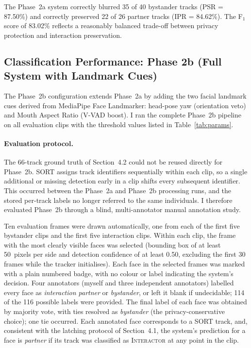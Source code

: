 The Phase~2a system correctly blurred 35 of 40 bystander tracks (PSR = 87.50\%) and
correctly preserved 22 of 26 partner tracks (IPR = 84.62\%). The F$_1$ score of
83.02\% reflects a reasonably balanced trade-off between privacy protection and
interaction preservation.

\subsection{Classification Performance: Phase 2b (Full System with Landmark Cues)}
\label{sec:results_2b}

The Phase~2b configuration extends Phase~2a by adding the two facial landmark
cues derived from MediaPipe Face Landmarker: head-pose yaw (orientation veto) and
Mouth Aspect Ratio (V-VAD boost). I ran the complete Phase~2b pipeline on all
evaluation clips with the threshold values listed in Table~\ref{tab:params}.

\paragraph{Evaluation protocol.}
The 66-track ground truth of Section~4.2 could not be reused directly for Phase~2b.
SORT assigns track identifiers sequentially within each clip, so a single additional
or missing detection early in a clip shifts every subsequent identifier. This
occurred between the Phase~2a and Phase~2b processing runs, and the stored per-track
labels no longer referred to the same individuals. I therefore evaluated Phase~2b
through a blind, multi-annotator manual annotation study.

Ten evaluation frames were drawn automatically, one from each of the first five
bystander clips and the first five interaction clips. Within each clip, the frame
with the most clearly visible faces was selected (bounding box of at least
50~pixels per side and detection confidence of at least 0.50, excluding the first
30 frames while the tracker initialises). Each face in the selected frames was
marked with a plain numbered badge, with no colour or label indicating the system's
decision. Four annotators (myself and three independent annotators)
labelled every face as \emph{interaction partner} or \emph{bystander}, or left it
blank if undecidable; 114 of the 116 possible labels were provided. The final label
of each face was obtained by majority vote, with ties resolved as \emph{bystander}
(the privacy-conservative choice); one tie occurred. Each annotated face corresponds
to a SORT track, and, consistent with the latching protocol of Section~4.1, the
system's prediction for a face is \emph{partner} if its track was classified as
\textsc{Interactor} at any point in the clip.

